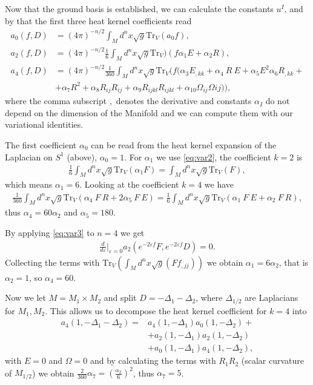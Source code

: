 Now that the ground basis is established, we can calculate the constants
$u^I$, and by that the first three heat kernel coefficients read
\begin{align}
    a_0(f, D) &= (4\pi)^{-n/2}\int_Md^n x\sqrt{g} \text{Tr}_V(a_0 f),\\
    a_2(f, D) &= (4\pi)^{-n/2}\frac{1}{6}\int_Md^n
    x\sqrt{g}\text{Tr}_V)(f\alpha _1 E+\alpha _2 R),\\
    a_4(f, D) &= (4\pi)^{-n/2}\frac{1}{360}\int_Md^n
    x\sqrt{g}\text{Tr}_V(f(\alpha_3 E_{,kk} + \alpha_4\ R\ E + \alpha_5 E^2
    \alpha_6 R_{,kk} + \nonumber\\
    &+\alpha_7 R^2 + \alpha_8 R_{ij}R_{ij} + \alpha_9
    R_{ijkl}R_{ijkl} +\alpha_{10} \Omega_{ij}\Omega{ij})),
\end{align}
where the comma subscript $,$ denotes the derivative and constants $\alpha_I$
do not depend on the dimension of the Manifold and we can compute them with
our variational identities.

The first coefficient $\alpha_0$ can be read from the heat kernel expansion of
the Laplacian on $S^1$ (above), $\alpha_0 = 1$. For $\alpha_1$ we use
\eqref{eq:var2}, the coefficient $k = 2$ is
\begin{align}
    \frac{1}{6} \int_M d^n x\sqrt{g} \text{Tr}_V(\alpha_1F) = \int_M d^n
    x\sqrt{g} \text{Tr}_V(F),
\end{align}
which means $\alpha_1 = 6$. Looking at the coefficient $k=4$ we have
\begin{align}
    \frac{1}{360}\int_Md^n x \sqrt{g}\text{Tr}_V(\alpha_4\ F\ R + 2\alpha_5\ F\ E)
    = \frac{1}{6} \int_Md^n x\sqrt{g}\text{Tr}_V(\alpha_1\ F\ E + \alpha_2\ F\ R),
\end{align}
thus $\alpha_4 = 60\alpha_2$ and $\alpha_5 = 180$.

By applying  \eqref{eq:var3} to $n=4$ we get
\begin{align}
    \frac{d}{d\varepsilon}|_{\varepsilon=0} a_2(e^{-2\varepsilon f}F,
    e^{-2\varepsilon f}D) = 0.
\end{align}
Collecting the terms with $\text{Tr}_V(\int_Md^nx\sqrt{g}(Ff_{,jj}))$ we
obtain $\alpha_1 = 6\alpha_2$, that is $\alpha_2 = 1$, so $\alpha_4 = 60$.

Now we let $M=M_1\times M_2$ and split $D = -\Delta_1 -\Delta_2$, where
$\Delta_{1/2}$ are Laplacians for $M_1, M_2$. This allows us to decompose the heat
kernel coefficient for $k=4$ into
\begin{align}
    a_4(1,-\Delta_1-\Delta_2) =& a_4(1, -\Delta_1) a_0(1,
    -\Delta_2)\nonumber+ \\
                               &+a_2(1,-\Delta_1) a_2(1,-\Delta_2)\nonumber \\
                               &+ a_0(1,-\Delta_1)a_4(1,-\Delta_2),
\end{align}
with $E=0$ and $\Omega =0$ and by calculating the terms with $R_1R_2$  (scalar
curvature of $M_{1/2}$) we obtain $\frac{2}{360}\alpha_7 =
(\frac{\alpha_2}{6})^2$, thus $\alpha_7 = 5$.

